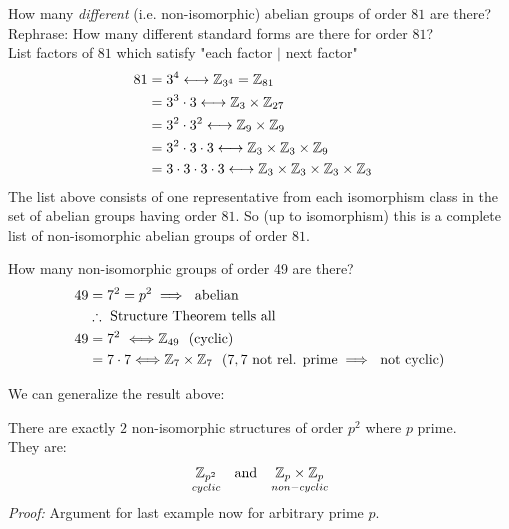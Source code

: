 \begin{example}
How many \textit{different} (i.e. non-isomorphic) abelian groups of order $81$ are there? \\
Rephrase: How many different standard forms are there for order $81$? \\
List factors of $81$ which satisfy "each factor $|$ next factor"
\begin{align}
    81 &= 3^4 \longleftrightarrow {\mathbb{Z}}_{3^4}={\mathbb{Z}}_{81}& \nonumber \\
    &= 3^3\cdot 3 \longleftrightarrow {\mathbb{Z}}_{3}\times{\mathbb{Z}}_{27}& \nonumber \\
    &= 3^2\cdot 3^2 \longleftrightarrow {\mathbb{Z}}_{9}\times {\mathbb{Z}}_{9}& \nonumber \\
    &= 3^2\cdot 3\cdot 3 \longleftrightarrow {\mathbb{Z}}_{3}\times {\mathbb{Z}}_{3}\times {\mathbb{Z}}_{9}& \nonumber \\
    &= 3\cdot 3\cdot 3\cdot 3 \longleftrightarrow {\mathbb{Z}}_{3}\times {\mathbb{Z}}_{3}\times {\mathbb{Z}}_{3}\times {\mathbb{Z}}_{3}& \nonumber
\end{align}
The list above consists of one representative from each isomorphism class in the set of abelian
groups having order $81$. So (up to isomorphism) this is a complete list of non-isomorphic abelian
groups of order $81$.
\end{example}

\begin{example}
How many non-isomorphic groups of order 49 are there?
\begin{align}
    49&=7^2=p^2 \implies \ \text{abelian} \nonumber \\
    &\therefore \text{ Structure Theorem tells all} \nonumber \\
    49&= 7^2 \ \Longleftrightarrow {\mathbb{Z}}_{49} \ \ (\text{cyclic}) \nonumber \\
    &= 7\cdot 7 \Longleftrightarrow {\mathbb{Z}}_7\times {\mathbb{Z}}_7 \ \ (7,7 \text{ not rel. prime} \implies \text{ not cyclic}) \nonumber
\end{align}
\end{example}
We can generalize the result above:
\begin{proposition}
    There are exactly $2$ non-isomorphic structures of order $p^2$ where $p$ prime.\\ They are:
    \begin{align}
        \underset{cyclic}{\Z_{p^2}} \ \ \text{ and } \ \ \underset{non-cyclic}{\Z_{p}\times \Z_{p}} \nonumber
    \end{align}
    \textit{Proof:} Argument for last example now for arbitrary prime $p$.
\end{proposition}


